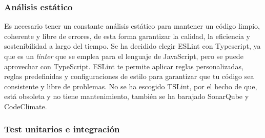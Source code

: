\subsubsection*{Análisis estático}
Es necesario tener un constante análisis estático para mantener un código limpio, coherente y libre de errores, de esta forma garantizar la calidad, la eficiencia y sostenibilidad a largo
del tiempo. Se ha decidido elegir ESLint con Typescript, ya que es un \textit{linter} que se emplea para el lenguaje de JavaScript, pero se puede aprovechar con TypeScript.
ESLint te permite aplicar reglas personalizadas, reglas predefinidas y configuraciones de estilo para garantizar que tu código sea consistente y libre de problemas.
No se ha escogido TSLint, por el hecho de que, está obsoleta y no tiene mantenimiento, también se ha barajado SonarQube y CodeClimate.

\subsubsection*{Test unitarios e integración}
